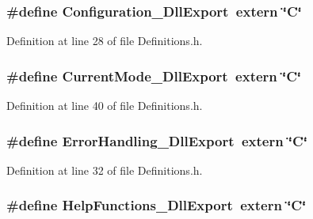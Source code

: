 \subsubsection[{\-Configuration\-\_\-\-Dll\-Export}]{\setlength{\rightskip}{0pt plus 5cm}\#define {\bf \-Configuration\-\_\-\-Dll\-Export}~extern \char`\"{}\-C\char`\"{}}\label{Definitions_8h_a132f2d5dd6821451c628cb47dec620d8}


\-Definition at line 28 of file \-Definitions.\-h.

\subsubsection[{\-Current\-Mode\-\_\-\-Dll\-Export}]{\setlength{\rightskip}{0pt plus 5cm}\#define {\bf \-Current\-Mode\-\_\-\-Dll\-Export}~extern \char`\"{}\-C\char`\"{}}\label{Definitions_8h_adb3c199a4b5ae60125ca3798ef06d646}


\-Definition at line 40 of file \-Definitions.\-h.

\subsubsection[{\-Error\-Handling\-\_\-\-Dll\-Export}]{\setlength{\rightskip}{0pt plus 5cm}\#define {\bf \-Error\-Handling\-\_\-\-Dll\-Export}~extern \char`\"{}\-C\char`\"{}}\label{Definitions_8h_a9cc2070b511830b9f5b2fe51a8cb6b51}


\-Definition at line 32 of file \-Definitions.\-h.

\subsubsection[{\-Help\-Functions\-\_\-\-Dll\-Export}]{\setlength{\rightskip}{0pt plus 5cm}\#define {\bf \-Help\-Functions\-\_\-\-Dll\-Export}~extern \char`\"{}\-C\char`\"{}}\label{Definitions_8h_aa56959c1aac33545b2de66cc5738d3cb}


